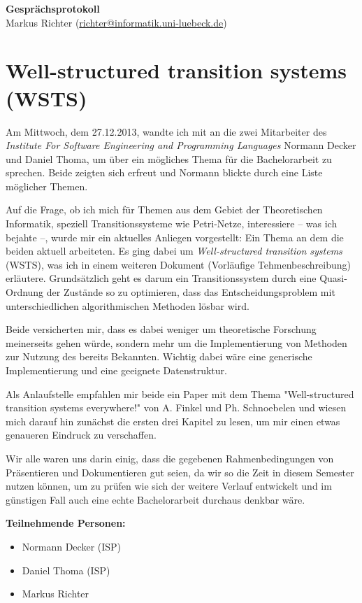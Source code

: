 \documentclass[
  a4paper,               %
  twoside,               %
  headings=small,        %
  DIV=12,                %
  BCOR=1cm,              %
  headinclude=true,      %
  footinclude=true,      %
  numbers=noenddot,      %
  11pt]{scrartcl}        %
\begin{document}
\begin{center}
\textbf{\huge Gesprächsprotokoll} \\[1em]
Markus Richter (\url{richter@informatik.uni-luebeck.de})
\end{center}


\section*{Well-structured transition systems (WSTS)}
Am Mittwoch, dem 27.12.2013, wandte ich mit an die zwei Mitarbeiter des \emph{Institute For Software Engineering and Programming Languages} Normann Decker und Daniel Thoma, um über ein mögliches Thema für die Bachelorarbeit zu sprechen. Beide zeigten sich erfreut und Normann blickte durch eine Liste möglicher Themen. 

Auf die Frage, ob ich mich für Themen aus dem Gebiet der Theoretischen Informatik, speziell Transitionssysteme wie Petri-Netze, interessiere -- was ich bejahte --, wurde mir ein aktuelles Anliegen vorgestellt: Ein Thema an dem die beiden aktuell arbeiteten. Es ging dabei um \emph{Well-structured transition systems} (WSTS), was ich in einem weiteren Dokument (Vorläufige Tehmenbeschreibung) erläutere. Grundsätzlich geht es darum ein Transitionssystem durch eine Quasi-Ordnung der Zustände so zu optimieren, dass das Entscheidungsproblem mit unterschiedlichen algorithmischen Methoden lösbar wird. 

Beide versicherten mir, dass es dabei weniger um theoretische Forschung meinerseits gehen würde, sondern mehr um die Implementierung von Methoden zur Nutzung des bereits Bekannten. Wichtig dabei wäre eine generische Implementierung und eine geeignete Datenstruktur. 

Als Anlaufstelle empfahlen mir beide ein Paper mit dem Thema "Well-structured transition systems everywhere!" von A. Finkel und Ph. Schnoebelen und wiesen mich darauf hin zunächst die ersten drei Kapitel zu lesen, um mir einen etwas genaueren Eindruck zu verschaffen.

Wir alle waren uns darin einig, dass die gegebenen Rahmenbedingungen von Präsentieren und Dokumentieren gut seien, da wir so die Zeit in diesem Semester nutzen können, um zu prüfen wie sich der weitere Verlauf entwickelt und im günstigen Fall auch eine echte Bachelorarbeit durchaus denkbar wäre. \bigskip

\textbf{Teilnehmende Personen:}\smallskip

\begin{itemize}
\item Normann Decker (ISP)
\item Daniel Thoma (ISP)
\item Markus Richter
\end{itemize}
\end{document}
